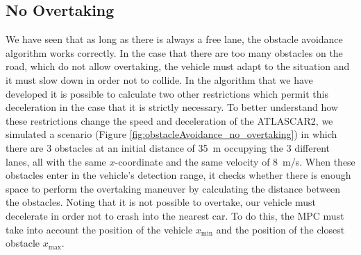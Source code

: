 \subsection{No Overtaking}
We have seen that as long as there is always a free lane, the obstacle avoidance algorithm works correctly. In the case that there are too many obstacles on the road, which do not allow overtaking, the vehicle must adapt to the situation and it must slow down in order not to collide. In the algorithm that we have developed it is possible to calculate two other restrictions which permit this deceleration in the case that it is strictly necessary. To better understand how these restrictions change the speed and deceleration of the ATLASCAR2, we simulated a scenario (Figure \ref{fig:obstacleAvoidance_no_overtaking}) in which there are 3 obstacles at an initial distance of \SI{35}{m} occupying the 3 different lanes, all with the same $x$-coordinate and the same velocity of \SI{8}{m/s}. When these obstacles enter in the vehicle's detection range, it checks whether there is enough space to perform the overtaking maneuver by calculating the distance between the obstacles. Noting that it is not possible to overtake, our vehicle must decelerate in order not to crash into the nearest car. To do this, the MPC must take into account the position of the vehicle $x_\text{min}$ and the position of the closest obstacle $x_\text{max}$.
